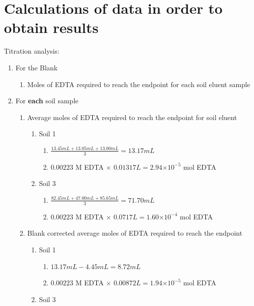 \documentclass[10pt]{article}
\providecommand{\e}[1]{\ensuremath{\times 10^{#1}}}
\begin{document}
\section{Calculations of data in order to obtain results}
Titration analysis:
\begin{enumerate}
    \item For the Blank
    \begin{enumerate}
        \item Moles of EDTA required to reach the endpoint for each soil eluent sample
    \end{enumerate}
    \item For \textbf{each} soil sample
    \begin{enumerate}
        \item Average moles of EDTA required to reach the endpoint for soil eluent
        \begin{enumerate}
            \item Soil 1
            \begin{enumerate}
                \item $\frac{13.45 mL + 13.05 mL + 13.00 mL}{3} = 13.17 mL$
                \item $0.00223$ M EDTA $\times$ $ 0.01317 L = 2.94 \e{-5} $ mol EDTA
            \end{enumerate}
            \item Soil 3
            \begin{enumerate}
                \item $\frac{82.45 mL + 47.00 mL + 85.65 mL}{3} = 71.70 mL$
                \item $0.00223$ M EDTA $\times$ $ 0.0717 L = 1.60 \e{-4} $ mol EDTA
            \end{enumerate}
        \end{enumerate}
        \item Blank corrected average moles of EDTA required to reach the endpoint
        \begin{enumerate}
            \item Soil 1
            \begin{enumerate}
                 \item $13.17 mL - 4.45 mL = 8.72 mL$
                 \item $0.00223$ M EDTA $\times$ $ 0.00872L = 1.94\e{-5}$ mol EDTA
            \end{enumerate}
            \item Soil 3
            \begin{enumerate}

\end{enumerate}
\end{enumerate}
\end{enumerate}
\end{enumerate}
\end{document}
